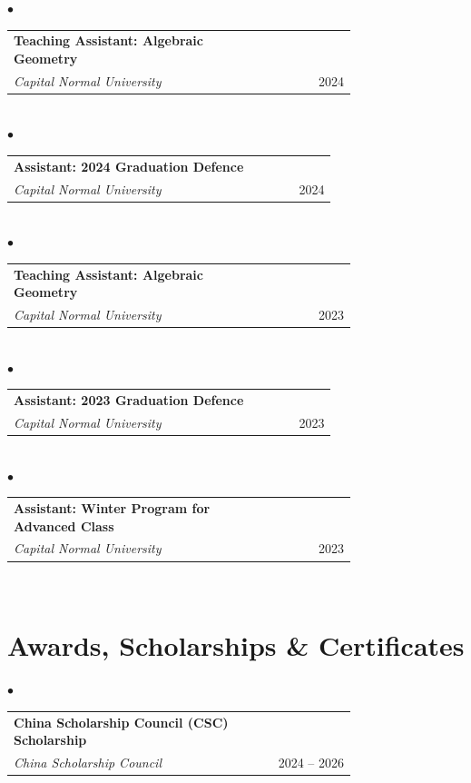 \documentclass[11pt, a4paper]{article}
\begin{document}
\hspace{1em}$\bullet$\quad\begin{tabular}{@{}p{0.75\linewidth}r@{}}\textbf{Teaching Assistant: Algebraic Geometry}\\
\textit{Capital Normal University} & 2024\\\end{tabular}\\

\hspace{1em}$\bullet$\quad\begin{tabular}{@{}p{0.75\linewidth}r@{}}\textbf{Assistant: 2024 Graduation Defence}\\
\textit{Capital Normal University} & 2024\\\end{tabular}\\

\hspace{1em}$\bullet$\quad\begin{tabular}{@{}p{0.75\linewidth}r@{}}\textbf{Teaching Assistant: Algebraic Geometry}\\
\textit{Capital Normal University} & 2023\\\end{tabular}\\

\hspace{1em}$\bullet$\quad\begin{tabular}{@{}p{0.75\linewidth}r@{}}\textbf{Assistant: 2023 Graduation Defence}\\
\textit{Capital Normal University} & 2023\\\end{tabular}\\

\hspace{1em}$\bullet$\quad\begin{tabular}{@{}p{0.75\linewidth}r@{}}\textbf{Assistant: Winter Program for Advanced Class}\\
\textit{Capital Normal University} & 2023\\\end{tabular}\\

\section{Awards, Scholarships \& Certificates}

\hspace{1em}$\bullet$\quad\begin{tabular}{@{}p{0.75\linewidth}r@{}}\textbf{China Scholarship Council (CSC) Scholarship}\\
\textit{China Scholarship Council} & 2024 – 2026\\\end{tabular}\\
\end{document}
